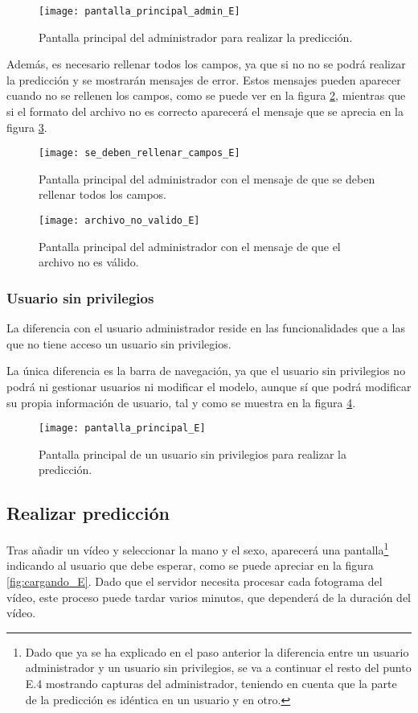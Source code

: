 \begin{figure}[ht]
	\texttt{[image: pantalla\_principal\_admin\_E]}
	\caption{Pantalla principal del administrador para realizar la predicción.}
	\label{fig:pantalla_principal_admin_E}
\end{figure}

Además, es necesario rellenar todos los campos, ya que si no no se podrá realizar la predicción y se mostrarán mensajes de error. Estos mensajes pueden aparecer cuando no se rellenen los campos, como se puede ver en la figura \ref{fig:se_deben_rellenar_campos_E}, mientras que si el formato del archivo no es correcto aparecerá el mensaje que se aprecia en la figura \ref{fig:archivo_no_valido_E}.

\begin{figure}[ht]
	\texttt{[image: se\_deben\_rellenar\_campos\_E]}
	\caption{Pantalla principal del administrador con el mensaje de que se deben rellenar todos los campos.}
	\label{fig:se_deben_rellenar_campos_E}
\end{figure}

\begin{figure}[ht]
	\texttt{[image: archivo\_no\_valido\_E]}
	\caption{Pantalla principal del administrador con el mensaje de que el archivo no es válido.}
	\label{fig:archivo_no_valido_E}
\end{figure}

\subsubsection{Usuario sin privilegios}
La diferencia con el usuario administrador reside en las funcionalidades que a las que no tiene acceso un usuario sin privilegios.

La única diferencia es la barra de navegación, ya que el usuario sin privilegios no podrá ni gestionar usuarios ni modificar el modelo, aunque sí que podrá modificar su propia información de usuario, tal y como se muestra en la figura \ref{fig:pantalla_principal_E}.

\begin{figure}[ht]
	\texttt{[image: pantalla\_principal\_E]}
	\caption{Pantalla principal de un usuario sin privilegios para realizar la predicción.}
	\label{fig:pantalla_principal_E}
\end{figure}

\subsection{Realizar predicción}
Tras añadir un vídeo y seleccionar la mano y el sexo, aparecerá una pantalla\footnote{Dado que ya se ha explicado en el paso anterior la diferencia entre un usuario administrador y un usuario sin privilegios, se va a continuar el resto del punto E.4 mostrando capturas del administrador, teniendo en cuenta que la parte de la predicción es idéntica en un usuario y en otro.} indicando al usuario que debe esperar, como se puede apreciar en la figura \ref{fig:cargando_E}. Dado que el servidor necesita procesar cada fotograma del vídeo, este proceso puede tardar varios minutos, que dependerá de la duración del vídeo.

